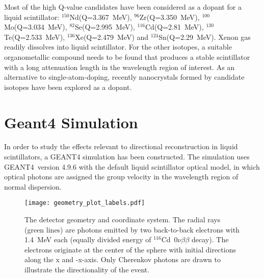 \documentclass[aps,prc,twocolumn,groupedaddress,showpacs,amsmath,amssymb,floatfix,superscriptaddress]{revtex4}
\newcommand{\GEANT}{GEANT4}
\begin{document}
Most of the high Q-value candidates
have been considered as a dopant for a liquid scintillator:
$^{150}$Nd(Q=3.367~MeV)\cite{minfang,nd1}, $^{96}$Zr(Q=3.350~MeV)\cite{zr1},
$^{100}$Mo(Q=3.034~MeV)\cite{mo1}, $^{82}$Se(Q=2.995~MeV)\cite{qdot},
$^{116}$Cd(Q=2.81~MeV)\cite{qdot, cd1}, $^{130}$Te(Q=2.533~MeV)\cite{qdot, biller},
$^{136}$Xe(Q=2.479~MeV)\cite{KZ0nu} and $^{124}$Sn(Q=2.29~MeV)\cite{sn1}.
Xenon gas readily dissolves into liquid scintillator. For the other isotopes,
a suitable organometallic compound needs to be found that produces a stable
scintillator with a long attenuation length in the wavelength region of
interest. As an alternative to single-atom-doping, recently nanocrystals 
formed by candidate isotopes have been explored as a dopant\cite{qdot,qdot2}.

\section{Geant4 Simulation}
In order to study the effects relevant to directional reconstruction
in liquid scintillators, a
\GEANT\cite{geant4one,geant4two} simulation has been constructed. The
simulation uses \GEANT~version 4.9.6 with the default liquid scintillator
optical model, in which optical photons are
assigned the group velocity in the wavelength region of normal
dispersion.

\begin{figure}
        \begin{center}
        \texttt{[image: geometry\_plot\_labels.pdf]}
        \caption[]{The detector geometry and coordinate system.
        The radial rays (green lines) are photons emitted by two back-to-back electrons with 1.4~MeV each
        (equally divided energy of $^{116}$Cd~$0\nu\beta\beta$ decay). The electrons originate at
        the center of the sphere with initial directions along the x
        and -x-axis. Only Cherenkov photons are drawn to illustrate the
        directionality of the event. \label{detector_view}}
        \end{center}
\end{figure}
\end{document}
